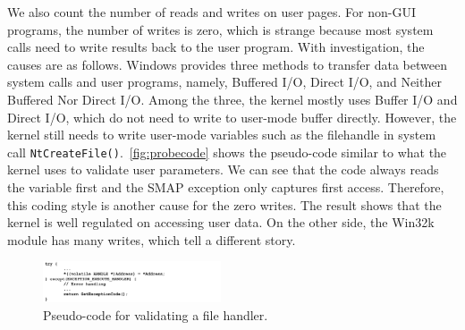 We also count the number of reads and writes on user pages. For non-GUI programs, the number of writes is zero, which is strange because most system calls need to write results back to the user program. With investigation, the causes are as follows. Windows provides three methods to transfer data between system calls and user programs, namely, Buffered I/O, Direct I/O, and Neither Buffered Nor Direct I/O. Among the three, the kernel mostly uses Buffer I/O and Direct I/O, which do not need to write to user-mode buffer directly. However, the kernel still needs to write user-mode variables such as the filehandle in system call \texttt{NtCreateFile()}.~\autoref{fig:probecode} shows the pseudo-code similar to what the kernel uses to validate user parameters. We can see that the code always reads the variable first and the SMAP exception only captures first access. Therefore, this coding style is another cause for the zero writes. The result shows that the kernel is well regulated on accessing user data. On the other side, the Win32k module has many writes, which tell a different story.

\begin{figure}[th]
  \includegraphics[width=0.47\textwidth]{figures/probecode}
  \centering
  \caption{Pseudo-code for validating a file handler.}
  \label{fig:probecode}
\end{figure}



%
%
%




